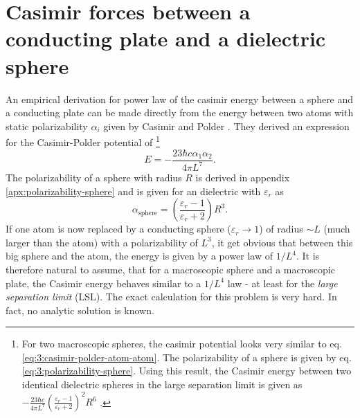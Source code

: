 \section{Casimir forces between a conducting plate and a dielectric sphere}
\label{sec:3:casimir-plate-sphere}

An empirical derivation for power law of the casimir energy between a sphere and a conducting plate can be made directly from the energy between two atoms with static polarizability $\alpha_i$ given by Casimir and Polder \cite{Casimir_1948a}. They derived an expression for the Casimir-Polder potential of \footnote{For two macroscopic spheres, the casimir potential looks very similar to eq. \eqref{eq:3:casimir-polder-atom-atom}. The polarizability of a sphere is given by eq. \eqref{eq:3:polarizability-sphere}. Using this result, the Casimir energy between two identical dielectric spheres in the large separation limit is given as $-\frac{23\hbar c}{4\pi L^7}\left(\frac{\varepsilon_r-1}{\varepsilon_r+2}\right)^2R^6$ \cite{Emig_2007}.}
\begin{equation}\label{eq:3:casimir-polder-atom-atom}
  E = -\frac{23\hbar c \alpha_1 \alpha_2}{4 \pi L^7} .
\end{equation}
The polarizability of a sphere with radius $R$ is derived in appendix \ref{apx:polarizability-sphere} and is given for an dielectric with $\varepsilon_r$ as 
\begin{equation} \label{eq:3:polarizability-sphere}
  \alpha_\mathrm{sphere} = \left(\frac{\varepsilon_r-1}{\varepsilon_r+2}\right)R^3 .
\end{equation}
If one atom is now replaced by a conducting sphere ($\varepsilon_r \rightarrow 1$) of radius $\sim L$ (much larger than the atom) with a polarizability of $L^3$, it get obvious that between this big sphere and the atom, the energy is given by a power law of $1/L^4$.
It is therefore natural to assume, that for a macroscopic sphere and a macroscopic plate, the Casimir energy behaves similar to a $1/L^4$ law - at least for the \textit{large separation limit} (LSL).
The exact calculation for this problem is very hard. In fact, no analytic solution is known.


